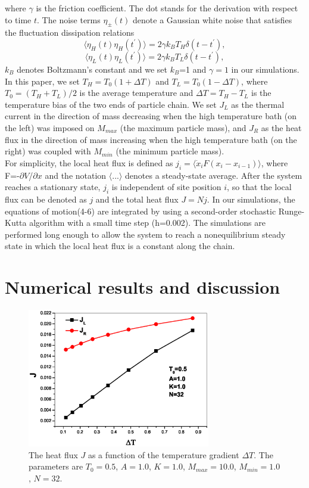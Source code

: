 \documentclass[pra,preprint,superscriptaddress,showkeys,showpacs]{revtex4}
\begin{document}
where $\gamma$ is the friction coefficient. The dot stands for the
derivation with respect to time $t$. The noise terms $\eta_{\pm}(t)$
denote a Gaussian white noise that satisfies the fluctuation
dissipation relations
\begin{equation}
\langle\eta_{H}(t)\eta_{H}(t^{'})\rangle=2\gamma{k_{B}}T_{H}\delta{(t-t^{'})},
\end{equation}
\begin{equation}
\langle\eta_{L}(t)\eta_{L}(t^{'})\rangle=2\gamma{k_{B}}T_{L}\delta{(t-t^{'})},
\end{equation}
$k_{B}$ denotes Boltzmann's constant and we set $k_{B}$=1 and
$\gamma=1$ in our
simulations. \\
\indent In this paper, we set $T_{H}=T_{0}(1+\Delta T)$ and
$T_{L}=T_{0}(1-\Delta T)$, where $T_{0}=(T_{H}+T_{L})/2$ is the
average temperature and $\Delta T=T_{H}-T_{L}$ is the temperature
bias of the two ends
 of particle chain. We set $J_{L}$ as the thermal current in the direction of mass decreasing when the
 high temperature bath (on the left) was imposed on $M_{max}$ (the maximum particle mass), and $J_{R}$ as the
 heat flux in the direction of mass increasing when the high temperature bath (on the right) was coupled
 with $M_{min}$ (the minimum particle mass).\\
\indent For simplicity, the local heat flux is defined as
$j_{i}=\langle{\dot{x}_{i}}F(x_{i}-x_{i-1})\rangle$, where
F=-$\partial{V}$/$\partial{x}$ and the notation
$\langle{...}\rangle$ denotes a steady-state average. After the
system reaches a stationary state, $j_{i}$ is independent of site
position $i$, so that the local flux can be denoted as $j$ and the
total heat flux $J=Nj$. In our simulations, the equations of
motion(4-6) are integrated by using a second-order stochastic
Runge-Kutta algorithm\cite{a26} with a small time step (h=0.002).
The simulations are performed long enough to allow the system to
reach a nonequilibrium steady state in which the local heat flux is
a constant along the chain.



\section {Numerical results and discussion}
\begin{figure}
\centering
\includegraphics[width=8cm]{fig1.eps}
\caption{The  heat flux $J$ as a function of the
temperature gradient $\Delta T$. The parameters are $T_{0}=0.5$,
$A=1.0$, $K=1.0$, $M_{max}=10.0$, $M_{min}=1.0$, $N=32$.}
\end{figure}
\end{document}
